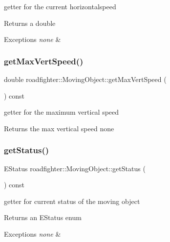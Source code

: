 getter for the current horizontalspeed \begin{DoxyReturn}{Returns}
a double 
\end{DoxyReturn}

\begin{DoxyExceptions}{Exceptions}
{\em none} & \\
\hline
\end{DoxyExceptions}
\mbox{\label{classroadfighter_1_1MovingObject_a5291cd441cc9b4f4650ff14c584f28d2}} 
\subsubsection{\texorpdfstring{get\+Max\+Vert\+Speed()}{getMaxVertSpeed()}}
{\footnotesize\ttfamily double roadfighter\+::\+Moving\+Object\+::get\+Max\+Vert\+Speed (\begin{DoxyParamCaption}{ }\end{DoxyParamCaption}) const}

getter for the maximum vertical speed \begin{DoxyReturn}{Returns}
the max vertical speed  none 
\end{DoxyReturn}
\mbox{\label{classroadfighter_1_1MovingObject_a05cbcd45fb2827a26f54500a897862b4}} 
\subsubsection{\texorpdfstring{get\+Status()}{getStatus()}}
{\footnotesize\ttfamily E\+Status roadfighter\+::\+Moving\+Object\+::get\+Status (\begin{DoxyParamCaption}{ }\end{DoxyParamCaption}) const}

getter for current status of the moving object \begin{DoxyReturn}{Returns}
an E\+Status enum 
\end{DoxyReturn}

\begin{DoxyExceptions}{Exceptions}
{\em none} & \\
\hline
\end{DoxyExceptions}
\mbox{\label{classroadfighter_1_1MovingObject_a447e1cfbdca177040016cd25f736d7df}} 
